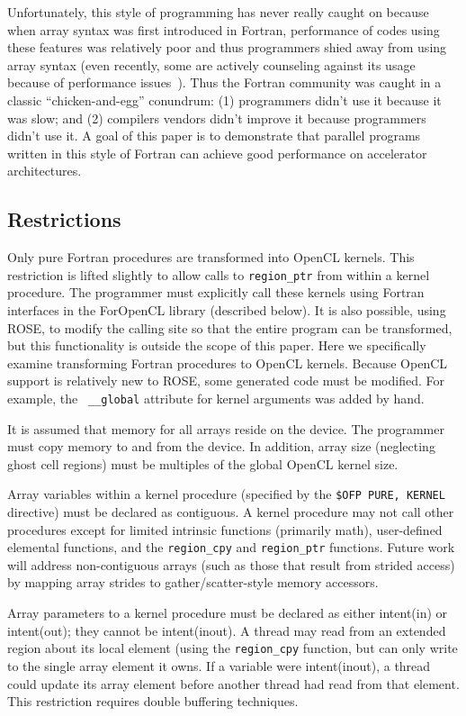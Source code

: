 Unfortunately, this style of programming has never really caught on because when
array syntax was first introduced in Fortran, performance of codes using these features was
relatively poor and thus programmers shied away from using array syntax (even
recently, some are actively counseling against its usage because of performance
issues~\cite{Levesque:SC08}).  Thus the Fortran community was caught in a
classic ``chicken-and-egg'' conundrum: (1) programmers didn't use it because it
was slow; and (2) compilers vendors didn't improve it because programmers didn't
use it.  A goal of this paper is to demonstrate that parallel programs written
in this style of Fortran can achieve good performance on accelerator architectures.

\subsection{Restrictions}

Only pure Fortran procedures are transformed into OpenCL kernels.  This restriction
is lifted slightly to allow calls to {\tt region\_ptr} from within a kernel procedure.  The
programmer must explicitly call these kernels using Fortran interfaces in the ForOpenCL
library (described below).  It is also possible, using ROSE, to modify the calling
site so that the entire program can be transformed, but this functionality is
outside the scope of this paper.  Here we specifically examine transforming
Fortran procedures to OpenCL kernels.  Because OpenCL support is relatively new
to ROSE, some generated code must be modified.  For example, the {\tt
  \_\_global} attribute for kernel arguments was added by hand.

It is assumed that memory for all arrays reside on the device.  The programmer
must copy memory to and from the device.  In addition, array size (neglecting
ghost cell regions) must be multiples of the global OpenCL kernel size.

Array variables within a kernel procedure (specified by the {\tt \!\$OFP PURE,
  KERNEL} directive) must be declared as contiguous.  A kernel procedure may not
call other procedures except for limited intrinsic functions (primarily math),
user-defined elemental functions, and the {\tt region\_cpy} and {\tt region\_ptr}
functions.  Future work will address non-contiguous arrays (such as those that
result from strided access) by mapping array strides to gather/scatter-style
memory accessors.

Array parameters to a kernel procedure must be declared as either intent(in) or
intent(out); they cannot be intent(inout).  A thread may read from an extended
region about its local element (using the {\tt region\_cpy} function, but can
only write to the single array element it owns.  If a variable were intent(inout),
a thread could update its array element before another thread had read from that
element.  This restriction requires double buffering techniques.
